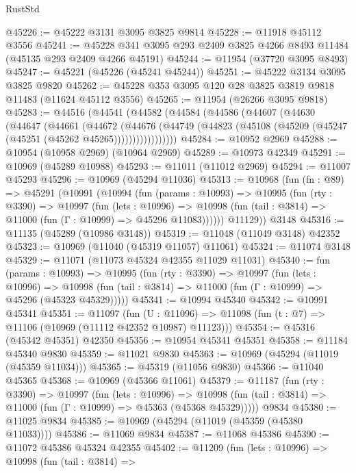 \begin{lexlean}{RustStd}
\begin{coremodule}
@45226 := @45222 @3131 @3095 @3825 @9814
@45228 := @11918 @45112 @3556
@45241 := @45228 @341 @3095 @293 @2409 @3825 @4266 @8493 @11484 (@45135 @293 @2409 @4266 @45191)
@45244 := @11954 (@37720 @3095 @8493)
@45247 := @45221 (@45226 (@45241 @45244))
@45251 := @45222 @3134 @3095 @3825 @9820
@45262 := @45228 @353 @3095 @120 @28 @3825 @3819 @9818 @11483 (@11624 @45112 @3556)
@45265 := @11954 (@26266 @3095 @9818)
@45283 := @44516
    (@44541
      (@44582
        (@44584
          (@44586
            (@44607
              (@44630
                (@44647
                  (@44661
                    (@44672
                      (@44676
                        (@44749
                          (@44823 (@45108 (@45209 (@45247 (@45251 (@45262 @45265)))))))))))))))))
@45284 := @10952 @2969
@45288 := @10954 (@10958 @2969) (@10964 @2969)
@45289 := @10973 @42349
@45291 := @10969 (@45289 @10988)
@45293 := @11011 (@11012 @2969)
@45294 := @11007 @45293
@45296 := @10969 (@45294 @11036)
@45313 := @10968
    (fun (fn : @89) =>
    @45291
      (@10991
        (@10994
          (fun (params : @10993) =>
          @10995
            (fun (rty : @3390) =>
            @10997
              (fun (lets : @10996) =>
              @10998 (fun (tail : @3814) => @11000 (fun (Γ : @10999) => @45296 @11083))))))
        @11129))
    @3148
@45316 := @11135 (@45289 (@10986 @3148))
@45319 := @11048 (@11049 @3148) @42352
@45323 := @10969 (@11040 (@45319 @11057) @11061)
@45324 := @11074 @3148
@45329 := @11071 (@11073 @45324 @42355 @11029 @11031)
@45340 := fun (params : @10993) =>
  @10995
    (fun (rty : @3390) =>
    @10997
      (fun (lets : @10996) =>
      @10998 (fun (tail : @3814) => @11000 (fun (Γ : @10999) => @45296 (@45323 @45329)))))
@45341 := @10994 @45340
@45342 := @10991 @45341
@45351 := @11097
    (fun (U : @11096) => @11098 (fun (t : @7) => @11106 (@10969 (@11112 @42352 @10987) @11123)))
@45354 := @45316 (@45342 @45351) @42350
@45356 := @10954 @45341 @45351
@45358 := @11184 @45340 @9830
@45359 := @11021 @9830
@45363 := @10969 (@45294 (@11019 (@45359 @11034)))
@45365 := @45319 (@11056 @9830)
@45366 := @11040 @45365
@45368 := @10969 (@45366 @11061)
@45379 := @11187
    (fun (rty : @3390) =>
    @10997
      (fun (lets : @10996) =>
      @10998 (fun (tail : @3814) => @11000 (fun (Γ : @10999) => @45363 (@45368 @45329)))))
    @9834
@45380 := @11025 @9834
@45385 := @10969 (@45294 (@11019 (@45359 (@45380 @11033))))
@45386 := @11069 @9834
@45387 := @11068 @45386
@45390 := @11072 @45386 @45324 @42355
@45402 := @11209
    (fun (lets : @10996) =>
    @10998
      (fun (tail : @3814) =>

\end{coremodule}
\end{lexlean}
